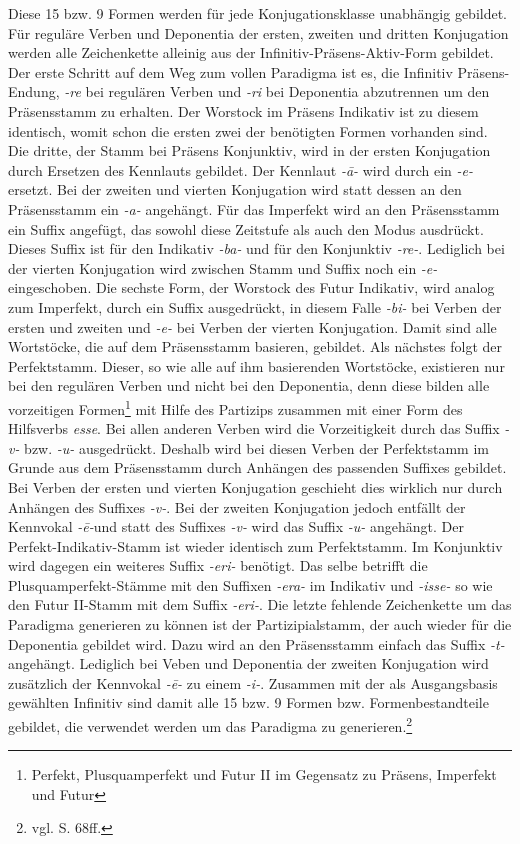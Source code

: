Diese 15 bzw. 9 Formen werden für jede Konjugationsklasse unabhängig gebildet. Für reguläre Verben und Deponentia der ersten, zweiten und dritten Konjugation werden alle Zeichenkette alleinig aus der Infinitiv-Präsens-Aktiv-Form gebildet. Der erste Schritt auf dem Weg zum vollen Paradigma ist es, die Infinitiv Präsens-Endung, \textit{-re} bei regulären Verben und \textit{-ri} bei Deponentia abzutrennen um den Präsensstamm zu erhalten. Der Worstock im Präsens Indikativ ist zu diesem identisch, womit schon die ersten zwei der benötigten Formen vorhanden sind. Die dritte, der Stamm bei Präsens Konjunktiv, wird in der ersten Konjugation durch Ersetzen des Kennlauts gebildet. Der Kennlaut \textit{-ā-} wird durch ein \textit{-e-} ersetzt. Bei der zweiten und vierten Konjugation wird statt dessen an den Präsensstamm ein \textit{-a-} angehängt. Für das Imperfekt wird an den Präsensstamm ein Suffix angefügt, das sowohl diese Zeitstufe als auch den Modus ausdrückt. Dieses Suffix ist für den Indikativ \textit{-ba-} und für den Konjunktiv \textit{-re-}. Lediglich bei der vierten Konjugation wird zwischen Stamm und Suffix noch ein \textit{-e-} eingeschoben. Die sechste Form, der Worstock des Futur Indikativ, wird analog zum Imperfekt, durch ein Suffix ausgedrückt, in diesem Falle \textit{-bi-} bei Verben der ersten und zweiten und \textit{-e-} bei Verben der vierten Konjugation. Damit sind alle Wortstöcke, die auf dem Präsensstamm basieren, gebildet. Als nächstes folgt der Perfektstamm. Dieser, so wie alle auf ihm basierenden Wortstöcke, existieren nur bei den regulären Verben und nicht bei den Deponentia, denn diese bilden alle vorzeitigen Formen\footnote{Perfekt, Plusquamperfekt und Futur II im Gegensatz zu Präsens, Imperfekt und Futur} mit Hilfe des Partizips zusammen mit einer Form des Hilfsverbs \textit{esse}. Bei allen anderen Verben wird die Vorzeitigkeit durch das Suffix \textit{-v-} bzw. \textit{-u-} ausgedrückt. Deshalb wird bei diesen Verben der Perfektstamm im Grunde aus dem Präsensstamm durch Anhängen des passenden Suffixes gebildet. Bei Verben der ersten und vierten Konjugation geschieht dies wirklich nur durch Anhängen des Suffixes \textit{-v-}. Bei der zweiten Konjugation jedoch entfällt der Kennvokal \textit{-ē-}und statt des Suffixes \textit{-v-} wird das Suffix \textit{-u-} angehängt. Der Perfekt-Indikativ-Stamm ist wieder identisch zum Perfektstamm. Im Konjunktiv wird dagegen ein weiteres Suffix \textit{-eri-} benötigt. Das selbe betrifft die Plusquamperfekt-Stämme mit den Suffixen \textit{-era-} im Indikativ und \textit{-isse-} so wie den Futur II-Stamm mit dem Suffix \textit{-eri-}. Die letzte fehlende Zeichenkette um das Paradigma generieren zu können ist der Partizipialstamm, der auch wieder für die Deponentia gebildet wird. Dazu wird an den Präsensstamm einfach das Suffix \textit{-t-} angehängt. Lediglich bei Veben und Deponentia der zweiten Konjugation wird zusätzlich der Kennvokal \textit{-ē-} zu einem \textit{-i-}. Zusammen mit der als Ausgangsbasis gewählten Infinitiv sind damit alle 15 bzw. 9 Formen bzw. Formenbestandteile gebildet, die verwendet werden um das Paradigma zu generieren.\footnote{vgl. \cite{BAYER-LINDAUER1994} S. 68ff.} \par
